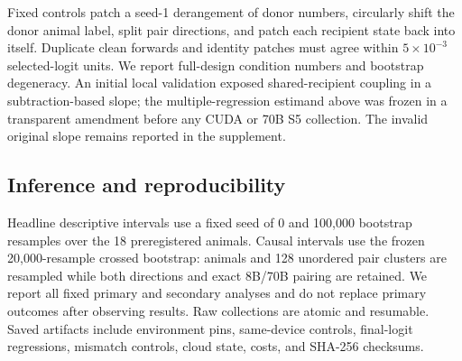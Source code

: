 Fixed controls patch a seed-1 derangement of donor numbers, circularly shift the
donor animal label, split pair directions, and patch each recipient state back
into itself. Duplicate clean forwards and identity patches must agree within
$5\times10^{-3}$ selected-logit units. We report full-design condition numbers
and bootstrap degeneracy. An initial local validation exposed shared-recipient
coupling in a subtraction-based slope; the multiple-regression estimand above
was frozen in a transparent amendment before any CUDA or 70B S5 collection.
The invalid original slope remains reported in the supplement.

\subsection{Inference and reproducibility}

Headline descriptive intervals use a fixed seed of 0 and 100,000 bootstrap
resamples over the 18 preregistered animals. Causal intervals use the frozen
20,000-resample crossed bootstrap: animals and 128 unordered pair clusters are
resampled while both directions and exact 8B/70B pairing are retained. We report
all fixed primary and secondary analyses and do not replace primary outcomes
after observing results. Raw collections are atomic and resumable. Saved
artifacts include environment pins, same-device controls, final-logit
regressions, mismatch controls, cloud state, costs, and SHA-256 checksums.
